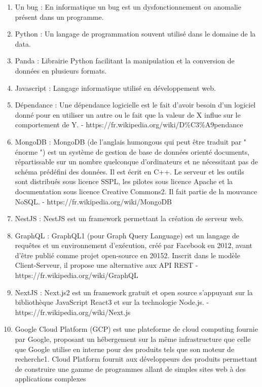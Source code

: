 \documentclass[12pt]{article}
\begin{document}
\begin {sloppypar}
\begin{enumerate}
    - https://fr.wikipedia.org/wiki/Biblioth\%C3\%A8que\_logicielle
  \item 
    Un bug : En informatique un bug est un dysfonctionnement ou anomalie présent dans un programme. 
  \item 
    Python : Un langage de programmation souvent utilisé dans le domaine de la data. 
  \item 
    Panda : Librairie Python facilitant la manipulation et la conversion de données en plusieurs formats. 
  \item 
    Javascript : Langage informatique utilisé en développement web. 
  \item 
    Dépendance : Une dépendance logicielle est le fait d'avoir besoin d'un logiciel donné pour en utiliser un autre ou le fait que la valeur de X influe sur le comportement de Y. 
    - https://fr.wikipedia.org/wiki/D\%C3\%A9pendance
  \item 
    MongoDB : MongoDB (de l'anglais humongous qui peut être traduit par " énorme ") est un système de gestion de base de données orienté documents, répartissable sur un nombre quelconque d'ordinateurs et ne nécessitant pas de schéma prédéfini des données. Il est écrit en C++. Le serveur et les outils sont distribués sous licence SSPL, les pilotes sous licence Apache et la documentation sous licence Creative Commons2. Il fait partie de la mouvance NoSQL. 
    - https://fr.wikipedia.org/wiki/MongoDB
  \item 
    NestJS : NestJS est un framework permettant la création de serveur web.
  \item 
    GraphQL : GraphQL1 (pour Graph Query Language) est un langage de requêtes et un environnement d'exécution, créé par Facebook en 2012, avant d'être publié comme projet open-source en 20152. Inscrit dans le modèle Client-Serveur, il propose une alternative aux API REST
    - https://fr.wikipedia.org/wiki/GraphQL
  \item 
    NextJS : Next.js2 est un framework gratuit et open source s'appuyant sur la bibliothèque JavaScript React3 et sur la technologie Node.js. 
    - https://fr.wikipedia.org/wiki/Next.js
  \item 
    Google Cloud Platform (GCP) est une plateforme de cloud computing fournie par Google, proposant un hébergement sur la même infrastructure que celle que Google utilise en interne pour des produits tels que son moteur de recherche1. Cloud Platform fournit aux développeurs des produits permettant de construire une gamme de programmes allant de simples sites web à des applications complexes

\end{enumerate}
\end{sloppypar}
\end{document}
